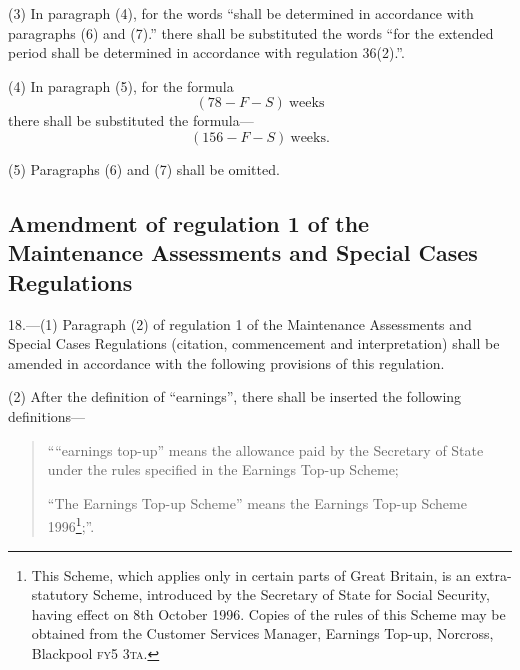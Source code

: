\documentclass[12pt,a4paper]{article}
\begin{document}
(3) In paragraph (4), for the words “shall be determined in accordance with paragraphs (6) and (7).” there shall be substituted the words “for the extended period shall be determined in accordance with regulation 36(2).”.

(4) In paragraph (5), for the formula
\[(78-F-S) \mathrm{\ weeks}\]
there shall be substituted the formula—
\[(156-F-S) \mathrm{\ weeks.}\]

(5) Paragraphs (6) and (7) shall be omitted.

\subsection[18. Amendment of regulation 1 of the Maintenance Assessments and Special Cases Regulations]{\sloppy Amendment of regulation 1 of the Maintenance Assessments and Special Cases Regulations}

18.—(1) Paragraph (2) of regulation 1 of the Maintenance Assessments and Special Cases Regulations (citation, commencement and interpretation) shall be amended in accordance with the following provisions of this regulation.

(2) After the definition of “earnings”, there shall be inserted the following definitions—
\begin{quotation}
““earnings top-up” means the allowance paid by the Secretary of State under the rules specified in the Earnings Top-up Scheme;

“The Earnings Top-up Scheme” means the Earnings Top-up Scheme 1996\footnote{\frenchspacing This Scheme, which applies only in certain parts of Great Britain, is an extra-statutory Scheme, introduced by the Secretary of State for Social Security, having effect on 8th October 1996. Copies of the rules of this Scheme may be obtained from the Customer Services Manager, Earnings Top-up, Norcross, Blackpool \textsc{\lowercase{FY5 3TA}}.};”.
\end{quotation}
\end{document}
